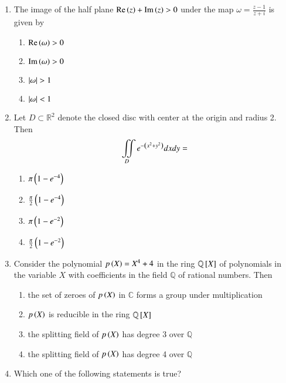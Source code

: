 \documentclass[journal]{IEEEtran}
\begin{document}
\begin{enumerate}
\item  The image of the half plane $\operatorname{Re}\left(z\right)+\operatorname{Im}\left(z\right)>0$ under the map $\omega=\frac{z-1}{z+i}$ is given by 
\begin{multicols}{4}
\begin{enumerate}
    \item $\operatorname{Re}\left(\omega\right)>0$
    \item $\operatorname{Im}\left(\omega\right)>0$
    \item $\left\vert\omega\right\vert>1$
    \item $\left\vert\omega\right\vert<1$
\end{enumerate}
\end{multicols}
\item Let $D \subset \mathbb{R}^2$ denote the closed disc with center at the origin and radius 2. Then
\begin{align*}
    \displaystyle \iint\limits_{D} e^{-\left(x^2+y^2\right)}dxdy=
\end{align*}
\begin{multicols}{4}
    \begin{enumerate}
        \item $\pi\left(1-e^{-4}\right)$
        \item $\frac{\pi}{2}\left(1-e^{-4}\right)$
        \item $\pi\left(1-e^{-2}\right)$
        \item $\frac{\pi}{2}\left(1-e^{-2}\right)$
    \end{enumerate}
\end{multicols}
\item Consider the polynomial $p\left(X\right)=X^4+4$ in the ring $\mathbb{Q}{}\left[X\right]$ of polynomials in the variable $X$ with coefficients in the field $\mathbb{Q}$ of rational numbers. Then
\begin{enumerate}
	\item the set of zeroes of $p\left(X\right)$ in $\mathbb{C}$ forms a group under multiplication
    \item $p\left(X\right)$ is reducible in the ring $\mathbb{Q}{}\left[X\right]$
    \item the splitting field of $p\left(X\right)$ has degree 3 over $\mathbb{Q}$
    \item the splitting field of $p\left(X\right)$ has degree 4 over $\mathbb{Q}$
\end{enumerate}
\item Which one of the following statements is true?
\begin{enumerate}

\end{enumerate}
\end{enumerate}
\end{document}
